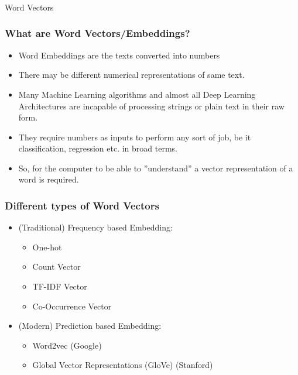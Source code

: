 \begin{frame}[fragile]\frametitle{}

\begin{center}
{\Large Word Vectors}
\end{center}
\end{frame}


\begin{frame}[fragile]\frametitle{What are Word Vectors/Embeddings?}
\begin{itemize}
\item Word Embeddings are the texts converted into numbers
\item There may be different numerical representations of  same text. 
\item Many Machine Learning algorithms and almost all Deep Learning Architectures are incapable of processing strings or plain text in their raw form. 
\item They require numbers as inputs to perform any sort of job, be it classification, regression etc. in broad terms.
\item So, for the computer to be able to ''understand'' a vector representation of a word is required.
\end{itemize}
\end{frame}

\begin{frame}[fragile]\frametitle{Different types of Word Vectors}
\begin{itemize}
\item (Traditional) Frequency based Embedding:
\begin{itemize}
\item One-hot
\item Count Vector
\item TF-IDF Vector
\item Co-Occurrence Vector
\end{itemize}
\item (Modern) Prediction based Embedding:
\begin{itemize}
\item Word2vec  (Google)
\item Global Vector Representations (GloVe)   (Stanford)
\end{itemize}
\end{itemize}
\end{frame}

